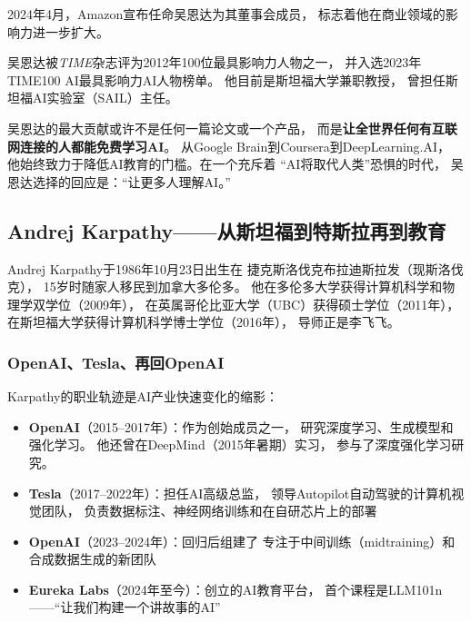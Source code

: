 2024年4月，Amazon宣布任命吴恩达为其董事会成员，
标志着他在商业领域的影响力进一步扩大。

吴恩达被\textit{TIME}杂志评为2012年100位最具影响力人物之一，
并入选2023年TIME100 AI最具影响力AI人物榜单。
他目前是斯坦福大学兼职教授，
曾担任斯坦福AI实验室（SAIL）主任。

\begin{corebox}
吴恩达的最大贡献或许不是任何一篇论文或一个产品，
而是\textbf{让全世界任何有互联网连接的人都能免费学习AI}。
从Google Brain到Coursera到DeepLearning.AI，
他始终致力于降低AI教育的门槛。在一个充斥着
``AI将取代人类''恐惧的时代，
吴恩达选择的回应是：``让更多人理解AI。''
\end{corebox}

\bigskip

\subsection{Andrej Karpathy——从斯坦福到特斯拉再到教育}
\label{sec:karpathy}

Andrej Karpathy于1986年10月23日出生在
捷克斯洛伐克布拉迪斯拉发（现斯洛伐克），
15岁时随家人移民到加拿大多伦多。
他在多伦多大学获得计算机科学和物理学双学位（2009年），
在英属哥伦比亚大学（UBC）获得硕士学位（2011年），
在斯坦福大学获得计算机科学博士学位（2016年），
导师正是李飞飞。

\subsubsection{OpenAI、Tesla、再回OpenAI}
Karpathy的职业轨迹是AI产业快速变化的缩影：
\begin{itemize}[noitemsep]
  \item \textbf{OpenAI}（2015--2017年）：作为创始成员之一，
    研究深度学习、生成模型和强化学习。
    他还曾在DeepMind（2015年暑期）实习，
    参与了深度强化学习研究。
  \item \textbf{Tesla}（2017--2022年）：担任AI高级总监，
    领导Autopilot自动驾驶的计算机视觉团队，
    负责数据标注、神经网络训练和在自研芯片上的部署
  \item \textbf{OpenAI}（2023--2024年）：回归后组建了
    专注于中间训练（midtraining）和合成数据生成的新团队
  \item \textbf{Eureka Labs}（2024年至今）：创立的AI教育平台，
    首个课程是LLM101n——``让我们构建一个讲故事的AI''
\end{itemize}

